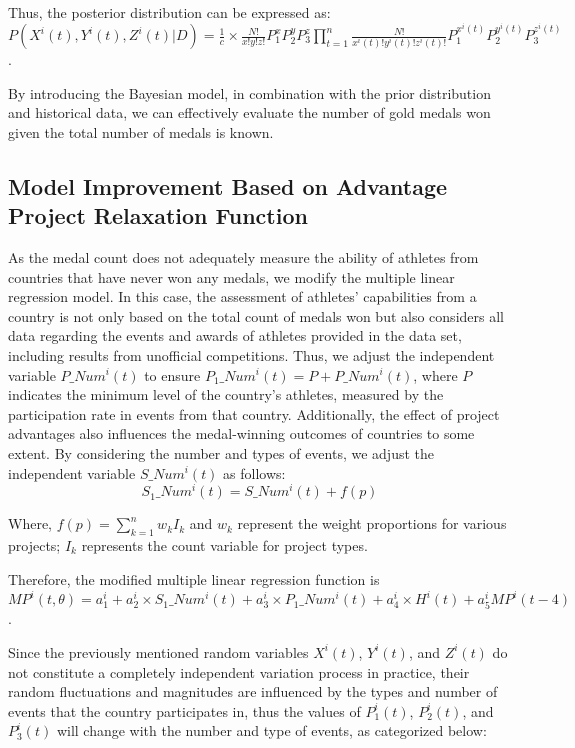\documentclass{mcmthesis}
\begin{document}
Thus, the posterior distribution can be expressed as: $P(X^{i}(t), Y^{i}(t), Z^{i}(t)|D) = \frac{1}{c} \times \frac{N!}{x!y!z!}P_{1}^{x}P_{2}^{y}P_{3}^{z}\prod_{t=1}^{n}\frac{N!}{x^{i}(t)!y^{i}(t)!z^{i}(t)!}P_{1}^{x^{i}(t)}P_{2}^{y^{i}(t)}P_{3}^{z^{i}(t)}$.

By introducing the Bayesian model, in combination with the prior distribution and historical data, we can effectively evaluate the number of gold medals won given the total number of medals is known.

\subsection{Model Improvement Based on Advantage Project Relaxation Function}
As the medal count does not adequately measure the ability of athletes from countries that have never won any medals, we modify the multiple linear regression model. In this case, the assessment of athletes' capabilities from a country is not only based on the total count of medals won but also considers all data regarding the events and awards of athletes provided in the data set, including results from unofficial competitions. Thus, we adjust the independent variable $P\_Num^{i}(t)$ to ensure $P_{1}\_Num^{i}(t) = P+P\_Num^{i}(t)$, where $P$ indicates the minimum level of the country's athletes, measured by the participation rate in events from that country. Additionally, the effect of project advantages also influences the medal-winning outcomes of countries to some extent. By considering the number and types of events, we adjust the independent variable $S\_Num^{i}(t)$ as follows:
\begin{equation}
S_{1}\_Num^{i}(t) = S\_Num^{i}(t) + f(p)
\end{equation}

Where, $f(p) = \sum_{k=1}^{n}w_{k}I_{k}$ and $w_{k}$ represent the weight proportions for various projects; $I_{k}$ represents the count variable for project types.

Therefore, the modified multiple linear regression function is $MP^{i}(t, \theta) = a_{1}^{i}+a_{2}^{i}\times S_{1}\_Num^{i}(t) + a_{3}^{i}\times P_{1}\_Num^{i}(t) + a_{4}^{i}\times H^{i}(t) + a_{5}^{i}MP^{i}(t-4)$.

Since the previously mentioned random variables $X^{i}(t)$, $Y^{i}(t)$, and $Z^{i}(t)$ do not constitute a completely independent variation process in practice, their random fluctuations and magnitudes are influenced by the types and number of events that the country participates in, thus the values of $P_{1}^{i}(t)$, $P_{2}^{i}(t)$, and $P_{3}^{i}(t)$ will change with the number and type of events, as categorized below:
\end{document}
